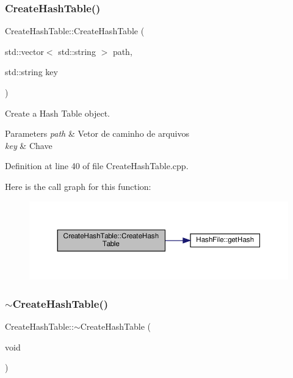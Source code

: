 \subsubsection{\texorpdfstring{Create\+Hash\+Table()}{CreateHashTable()}\hspace{0.1cm}{\footnotesize\ttfamily [2/2]}}
{\footnotesize\ttfamily Create\+Hash\+Table\+::\+Create\+Hash\+Table (\begin{DoxyParamCaption}\item[{std\+::vector$<$ std\+::string $>$}]{path,  }\item[{std\+::string}]{key }\end{DoxyParamCaption})}



Create a Hash Table object. 


\begin{DoxyParams}{Parameters}
{\em path} & Vetor de caminho de arquivos \\
\hline
{\em key} & Chave \\
\hline
\end{DoxyParams}


Definition at line 40 of file Create\+Hash\+Table.\+cpp.

Here is the call graph for this function\+:
\nopagebreak
\begin{figure}[H]
\begin{center}
\leavevmode
\includegraphics[width=350pt]{d9/d9e/class_create_hash_table_a3aac5164fee71508dbd12eaa4c81ab44_cgraph}
\end{center}
\end{figure}
\mbox{\label{class_create_hash_table_abf22158361dd73d04edf1739ef6b3482}} 
\subsubsection{\texorpdfstring{$\sim$\+Create\+Hash\+Table()}{~CreateHashTable()}}
{\footnotesize\ttfamily Create\+Hash\+Table\+::$\sim$\+Create\+Hash\+Table (\begin{DoxyParamCaption}\item[{void}]{ }\end{DoxyParamCaption})}



